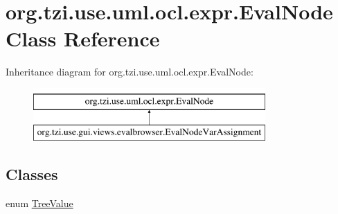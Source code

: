 \hypertarget{classorg_1_1tzi_1_1use_1_1uml_1_1ocl_1_1expr_1_1_eval_node}{\section{org.\-tzi.\-use.\-uml.\-ocl.\-expr.\-Eval\-Node Class Reference}
\label{classorg_1_1tzi_1_1use_1_1uml_1_1ocl_1_1expr_1_1_eval_node}
}
Inheritance diagram for org.\-tzi.\-use.\-uml.\-ocl.\-expr.\-Eval\-Node\-:\begin{figure}[H]
\begin{center}
\leavevmode
\includegraphics[height=2.000000cm]{classorg_1_1tzi_1_1use_1_1uml_1_1ocl_1_1expr_1_1_eval_node}
\end{center}
\end{figure}
\subsection*{Classes}
\begin{DoxyCompactItemize}
\item 
enum \hyperlink{enumorg_1_1tzi_1_1use_1_1uml_1_1ocl_1_1expr_1_1_eval_node_1_1_tree_value}{Tree\-Value}
\end{DoxyCompactItemize}
